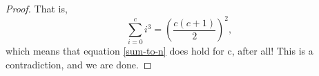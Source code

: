\documentclass[twoside,12pt]{article}
\begin{document}
\begin{problem}{15}
{\begin{proof}
That is,
\[
\sum_{i=0}^{c} i^3 = \left(\frac{c(c+1)}{2}\right)^2,
\]
which means that equation \ref{sum-to-n} does hold for c, after all! This is a contradiction, and we are done.

\end{proof}
}

\end{problem}
\end{document}
